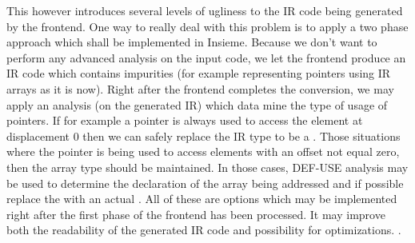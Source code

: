 This however introduces several levels of ugliness to the IR code being
generated by the frontend. One way to really deal with this problem is to apply
a two phase approach which shall be implemented in Insieme. Because we don't
want to perform any advanced analysis on the input code, we let the frontend
produce an IR code which contains impurities (for example representing pointers
using IR arrays as it is now). Right after the frontend completes the
conversion, we may apply an analysis (on the generated IR) which data mine the
type of usage of pointers. If for example a pointer is always used to access the
element at displacement 0 then we can safely replace the IR type to be a
. Those situations where the pointer is being used to
access elements with an offset not equal zero, then the array type should be
maintained. In those cases, DEF-USE  analysis may be used to
determine the declaration of the array being addressed and if possible replace
the  with an actual
. All of these are options which may be
implemented right after the first phase of the frontend has been processed. It
may improve both the readability of the generated IR code and possibility for
optimizations. .

